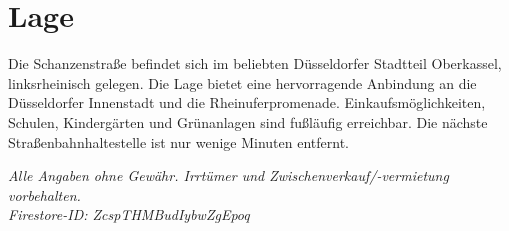 \documentclass[11pt,a4paper]{article}
\begin{document}
\vspace{0.5cm}

\section*{Lage}

Die Schanzenstraße befindet sich im beliebten Düsseldorfer Stadtteil Oberkassel, linksrheinisch gelegen. Die Lage bietet eine hervorragende Anbindung an die Düsseldorfer Innenstadt und die Rheinuferpromenade. Einkaufsmöglichkeiten, Schulen, Kindergärten und Grünanlagen sind fußläufig erreichbar. Die nächste Straßenbahnhaltestelle ist nur wenige Minuten entfernt.

\vspace{1cm}

\begin{center}
    \small\textit{Alle Angaben ohne Gewähr. Irrtümer und Zwischenverkauf/-vermietung vorbehalten.}\\[0.3cm]
    \small\textit{Firestore-ID: ZcspTHMBudIybwZgEpoq}
\end{center}
\end{document}
